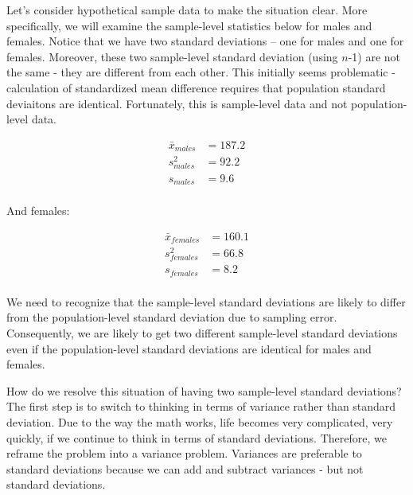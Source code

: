 \documentclass[
]{krantz}
\begin{document}
Let's consider hypothetical sample data to make the situation clear. More specifically, we will examine the sample-level statistics below for males and females. Notice that we have two standard deviations -- one for males and one for females. Moreover, these two sample-level standard deviation (using \(n\)-1) are not the same - they are different from each other. This initially seems problematic - calculation of standardized mean difference requires that population standard deviaitons are identical. Fortunately, this is sample-level data and not population-level data.

\[
\begin{aligned} 
\bar{x}_{males} &= 187.2 \\
s_{males}^2 &= 92.2 \\
s_{males} &= 9.6 \\
\end{aligned} 
\]

And females:

\[
\begin{aligned} 
\bar{x}_{females} &= 160.1 \\
s_{females}^2 &= 66.8 \\
s_{females} &= 8.2 \\
\end{aligned} 
\]

We need to recognize that the sample-level standard deviations are likely to differ from the population-level standard deviation due to sampling error. Consequently, we are likely to get two different sample-level standard deviations even if the population-level standard deviations are identical for males and females.

How do we resolve this situation of having two sample-level standard deviations? The first step is to switch to thinking in terms of variance rather than standard deviation. Due to the way the math works, life becomes very complicated, very quickly, if we continue to think in terms of standard deviations. Therefore, we reframe the problem into a variance problem. Variances are preferable to standard deviations because we can add and subtract variances - but not standard deviations.
\end{document}
